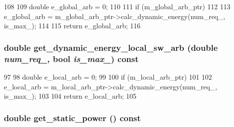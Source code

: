 \begin{DoxyCode}
108 {
109     double e_global_arb = 0;
110 
111     if (m_global_arb_ptr)
112     {
113         e_global_arb = m_global_arb_ptr->calc_dynamic_energy(num_req_, is_max_);
114     }
115     return e_global_arb;
116 }
\end{DoxyCode}
\hypertarget{classSWAllocator_a254acb37b83be6191773cfccdc726ca3}{
\subsubsection[{get\_\-dynamic\_\-energy\_\-local\_\-sw\_\-arb}]{\setlength{\rightskip}{0pt plus 5cm}double get\_\-dynamic\_\-energy\_\-local\_\-sw\_\-arb (double {\em num\_\-req\_\-}, \/  bool {\em is\_\-max\_\-}) const}}
\label{classSWAllocator_a254acb37b83be6191773cfccdc726ca3}



\begin{DoxyCode}
97 {
98     double e_local_arb = 0;
99 
100     if (m_local_arb_ptr)
101     {
102         e_local_arb = m_local_arb_ptr->calc_dynamic_energy(num_req_, is_max_);
103     }
104     return e_local_arb;
105 }
\end{DoxyCode}
\hypertarget{classSWAllocator_aeb5933543cfdeb1668baed5ce7c68351}{
\subsubsection[{get\_\-static\_\-power}]{\setlength{\rightskip}{0pt plus 5cm}double get\_\-static\_\-power () const}}
\label{classSWAllocator_aeb5933543cfdeb1668baed5ce7c68351}



